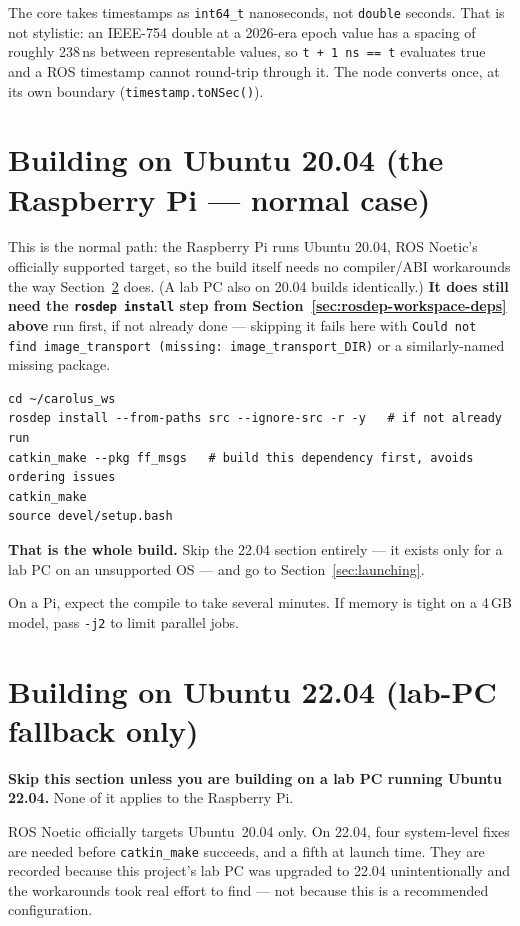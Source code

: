 \documentclass[11pt]{report}
\begin{document}
The core takes timestamps as \texttt{int64\_t} nanoseconds, not
\texttt{double} seconds. That is not stylistic: an IEEE-754 double at a
2026-era epoch value has a spacing of roughly 238\,ns between representable
values, so \texttt{t + 1\,ns == t} evaluates true and a ROS timestamp cannot
round-trip through it. The node converts once, at its own boundary
(\texttt{timestamp.toNSec()}).

\section{Building on Ubuntu 20.04 (the Raspberry Pi --- normal case)}
\label{sec:build2004}

This is the normal path: the Raspberry Pi runs Ubuntu 20.04, ROS Noetic's
officially supported target, so the build itself needs no compiler/ABI
workarounds the way Section~\ref{sec:build2204} does. (A lab PC also on
20.04 builds identically.) \textbf{It does still need the \texttt{rosdep
install} step from Section~\ref{sec:rosdep-workspace-deps} above} run
first, if not already done --- skipping it fails here with \texttt{Could
not find image\_transport (missing: image\_transport\_DIR)} or a
similarly-named missing package.

\begin{lstlisting}[style=shell]
cd ~/carolus_ws
rosdep install --from-paths src --ignore-src -r -y   # if not already run
catkin_make --pkg ff_msgs   # build this dependency first, avoids ordering issues
catkin_make
source devel/setup.bash
\end{lstlisting}

\textbf{That is the whole build.} Skip the 22.04 section entirely --- it
exists only for a lab PC on an unsupported OS --- and go to
Section~\ref{sec:launching}.

On a Pi, expect the compile to take several minutes. If memory is tight on a
4\,GB model, pass \texttt{-j2} to limit parallel jobs.

\section{Building on Ubuntu 22.04 (lab-PC fallback only)}
\label{sec:build2204}

\textbf{Skip this section unless you are building on a lab PC running
Ubuntu 22.04.} None of it applies to the Raspberry Pi.

ROS Noetic officially targets Ubuntu~20.04 only. On 22.04, four system-level
fixes are needed before \texttt{catkin\_make} succeeds, and a fifth at launch
time. They are recorded because this project's lab PC was upgraded to 22.04
unintentionally and the workarounds took real effort to find --- not because
this is a recommended configuration.
\end{document}
